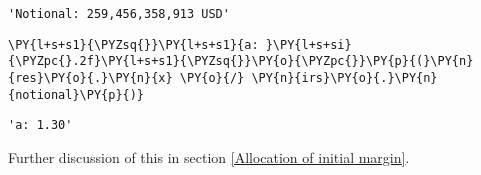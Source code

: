             \begin{tcolorbox}[breakable, size=fbox, boxrule=.5pt, pad at break*=1mm, opacityfill=0]
\begin{Verbatim}[commandchars=\\\{\}]
'Notional: 259,456,358,913 USD'
\end{Verbatim}
\end{tcolorbox}
        
    \begin{tcolorbox}[breakable, size=fbox, boxrule=1pt, pad at break*=1mm,colback=cellbackground, colframe=cellborder]
\begin{Verbatim}[commandchars=\\\{\}]
\PY{l+s+s1}{\PYZsq{}}\PY{l+s+s1}{a: }\PY{l+s+si}{\PYZpc{}.2f}\PY{l+s+s1}{\PYZsq{}}\PY{o}{\PYZpc{}}\PY{p}{(}\PY{n}{res}\PY{o}{.}\PY{n}{x} \PY{o}{/} \PY{n}{irs}\PY{o}{.}\PY{n}{notional}\PY{p}{)}
\end{Verbatim}
\end{tcolorbox}

            \begin{tcolorbox}[breakable, size=fbox, boxrule=.5pt, pad at break*=1mm, opacityfill=0]
\begin{Verbatim}[commandchars=\\\{\}]
'a: 1.30'
\end{Verbatim}
\end{tcolorbox}
        
    Further discussion of this in section
\ref{Allocation of initial margin}.


